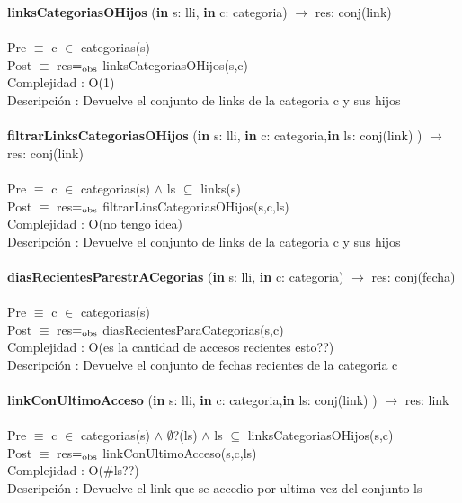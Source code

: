 \documentclass[10pt, a4paper]{article}
\begin{document}
	
	\textbf{linksCategoriasOHijos} (\textbf{in} s: lli, \textbf{in} c: categoria) $\longrightarrow$ res: conj(link)\\\\
	Pre $\equiv$ {c $\in$ categorias(s)}\\
	Post $\equiv$ {res$=_{\mathrm{obs}}$ linksCategoriasOHijos(s,c)}\\
	Complejidad : O(1)\\
	Descripci\'{o}n : Devuelve el conjunto de links de la categoria c y sus hijos\\\\
	
	
	\textbf{filtrarLinksCategoriasOHijos} (\textbf{in} s: lli, \textbf{in} c: categoria,\textbf{in} ls: conj(link) ) $\longrightarrow$ res: conj(link)\\\\
	Pre $\equiv$ {c $\in$ categorias(s) $\wedge$ ls $\subseteq$ links(s)}\\
	Post $\equiv$ {res$=_{\mathrm{obs}}$ filtrarLinsCategoriasOHijos(s,c,ls)}\\
	Complejidad : O(no tengo idea)\\
	Descripci\'{o}n : Devuelve el conjunto de links de la categoria c y sus hijos\\\\

	\textbf{diasRecientesParestrACegorias} (\textbf{in} s: lli, \textbf{in} c: categoria) $\longrightarrow$ res: conj(fecha)\\\\
	Pre $\equiv$ {c $\in$ categorias(s)}\\
	Post $\equiv$ {res$=_{\mathrm{obs}}$ diasRecientesParaCategorias(s,c)}\\
	Complejidad : O(es la cantidad de accesos recientes esto??)\\
	Descripci\'{o}n : Devuelve el conjunto de fechas recientes de la categoria c\\\\
	
	\textbf{linkConUltimoAcceso} (\textbf{in} s: lli, \textbf{in} c: categoria,\textbf{in} ls: conj(link) ) $\longrightarrow$ res: link\\\\
	Pre $\equiv$ {c $\in$ categorias(s) $\wedge$ $\emptyset$?(ls) $\wedge$ ls $\subseteq$ linksCategoriasOHijos(s,c)}\\
	Post $\equiv$ {res$=_{\mathrm{obs}}$ linkConUltimoAcceso(s,c,ls)}\\
	Complejidad : O($\#$ls??)\\
	Descripci\'{o}n : Devuelve el link que se accedio por ultima vez del conjunto ls\\\\
	
\end{document}
